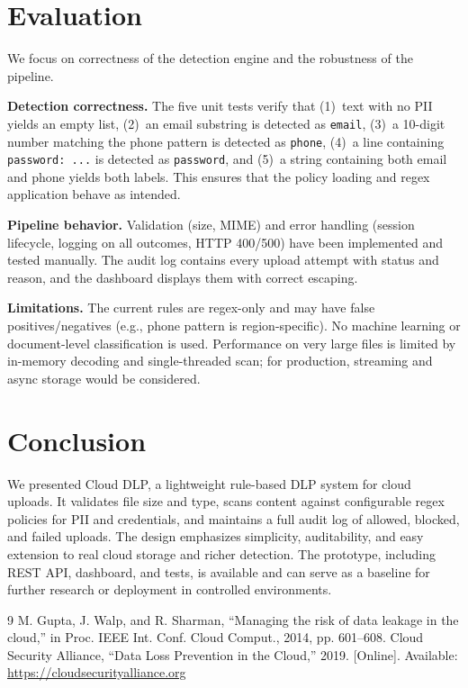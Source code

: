 \documentclass[11pt,a4paper]{article}
\begin{document}
\section{Evaluation}
\label{sec:eval}

We focus on correctness of the detection engine and the robustness of the pipeline.

\textbf{Detection correctness.} The five unit tests verify that (1)~text with no PII yields an empty list, (2)~an email substring is detected as \texttt{email}, (3)~a 10-digit number matching the phone pattern is detected as \texttt{phone}, (4)~a line containing \texttt{password: ...} is detected as \texttt{password}, and (5)~a string containing both email and phone yields both labels. This ensures that the policy loading and regex application behave as intended.

\textbf{Pipeline behavior.} Validation (size, MIME) and error handling (session lifecycle, logging on all outcomes, HTTP 400/500) have been implemented and tested manually. The audit log contains every upload attempt with status and reason, and the dashboard displays them with correct escaping.

\textbf{Limitations.} The current rules are regex-only and may have false positives/negatives (e.g., phone pattern is region-specific). No machine learning or document-level classification is used. Performance on very large files is limited by in-memory decoding and single-threaded scan; for production, streaming and async storage would be considered.

\section{Conclusion}
\label{sec:conc}

We presented Cloud DLP, a lightweight rule-based DLP system for cloud uploads. It validates file size and type, scans content against configurable regex policies for PII and credentials, and maintains a full audit log of allowed, blocked, and failed uploads. The design emphasizes simplicity, auditability, and easy extension to real cloud storage and richer detection. The prototype, including REST API, dashboard, and tests, is available and can serve as a baseline for further research or deployment in controlled environments.

\begin{thebibliography}{9}
 M. Gupta, J. Walp, and R. Sharman, ``Managing the risk of data leakage in the cloud,'' in Proc. IEEE Int. Conf. Cloud Comput., 2014, pp. 601--608.
 Cloud Security Alliance, ``Data Loss Prevention in the Cloud,'' 2019. [Online]. Available: \url{https://cloudsecurityalliance.org}
\end{thebibliography}
\end{document}
